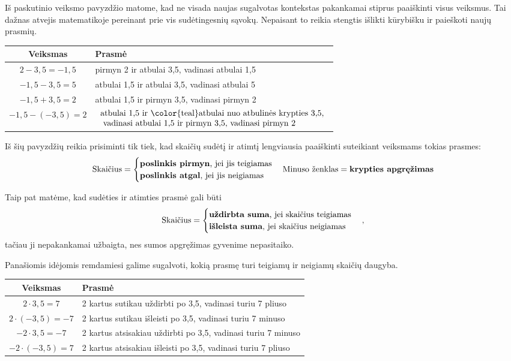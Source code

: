 \documentclass[a4paper]{article}
\begin{document}
Iš paskutinio veiksmo pavyzdžio matome, kad ne visada naujas sugalvotas kontekstas pakankamai stiprus paaiškinti visus veiksmus. Tai dažnas atvejis matematikoje pereinant prie vis sudėtingesnių sąvokų. Nepaisant to reikia stengtis išlikti kūrybišku ir paieškoti naujų prasmių.

 \begin{tabular}{|c|l|}
\hline
\textbf{Veiksmas} & \textbf{Prasmė} \\ \hline 
$2 - 3,5 = -1,5$ & pirmyn 2 ir atbulai 3,5, vadinasi atbulai 1,5\\ \hline
$-1,5 - 3,5 = 5$ & atbulai 1,5 ir atbulai 3,5, vadinasi atbulai 5 \\ \hline
$-1,5 + 3,5 = 2$ & atbulai 1,5 ir pirmyn 3,5, vadinasi pirmyn 2\\ \hline
$-1,5 -(- 3,5) = 2$ & $\begin{array}{ll}\text{atbulai 1,5 ir  {\color{teal}atbulai nuo atbulinės krypties 3,5,}}\\ \text{ vadinasi atbulai 1,5 ir pirmyn 3,5, vadinasi pirmyn 2} \end{array}$ \\ \hline
\end{tabular}

Iš šių pavyzdžių reikia prisiminti tik tiek, kad skaičių sudėtį ir atimtį lengviausia paaiškinti suteikiant veiksmams tokias prasmes: 
$$\text{Skaičius} = \begin{cases} \text{\textbf{poslinkis pirmyn}, jei jis teigiamas} \\ \text{\textbf{poslinkis atgal}, jei jis neigiamas}\end{cases} \text{Minuso ženklas} = \text{\textbf{krypties apgręžimas}}$$

Taip pat matėme, kad sudėties ir atimties prasmė gali būti $$\text{Skaičius}=\begin{cases} \text{\textbf{uždirbta suma}, jei skaičius teigiamas} \\ \text{\textbf{išleista suma}, jei skaičius neigiamas}\end{cases},$$ tačiau ji nepakankamai užbaigta, nes sumos apgręžimas gyvenime nepasitaiko.

Panašiomis idėjomis remdamiesi galime sugalvoti, kokią prasmę turi teigiamų ir neigiamų skaičių daugyba.

\begin{tabular}{|c|l|}
\hline
\textbf{Veiksmas} & \textbf{Prasmė} \\ \hline 
$2 \cdot 3,5 = 7$ & 2 kartus sutikau uždirbti po 3,5, vadinasi turiu 7 pliuso\\ \hline
$2 \cdot (-3,5) = -7$ & 2 kartus sutikau išleisti po 3,5, vadinasi turiu 7 minuso\\ \hline
$-2 \cdot 3,5 = -7$ & 2 kartus atsisakiau uždirbti po 3,5, vadinasi turiu 7 minuso\\ \hline
$-2\cdot (- 3,5) = 7$ & 2 kartus atsisakiau išleisti po 3,5, vadinasi turiu 7 pliuso \\ \hline
\end{tabular}
\end{document}

